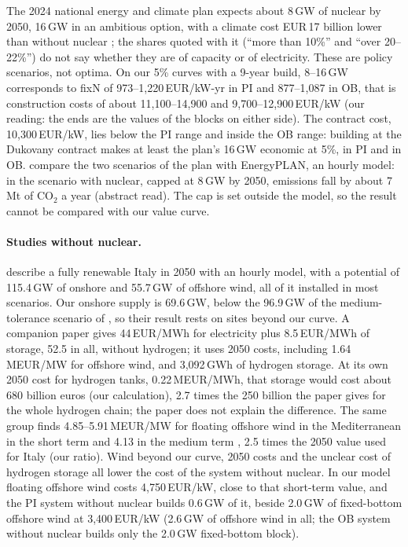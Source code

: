 The 2024 national energy and climate plan expects about 8\,GW of nuclear by 2050, 16\,GW in an ambitious option, with a climate cost EUR\,17 billion lower than without nuclear \citep{WNNPNIEC2024}; the shares quoted with it (``more than 10\%'' and ``over 20--22\%'') do not say whether they are of capacity or of electricity. These are policy scenarios, not optima. On our 5\% curves with a 9-year build, 8--16\,GW corresponds to fixN of 973--1{,}220\,EUR/kW-yr in PI and 877--1{,}087 in OB, that is construction costs of about 11{,}100--14{,}900 and 9{,}700--12{,}900\,EUR/kW (our reading: the ends are the values of the blocks on either side). The contract cost, 10{,}300\,EUR/kW, lies below the PI range and inside the OB range: building at the Dukovany contract makes at least the plan's 16\,GW economic at 5\%, in PI and in OB. \citet{Battaglia2025} compare the two scenarios of the plan with EnergyPLAN, an hourly model: in the scenario with nuclear, capped at 8\,GW by 2050, emissions fall by about 7\,Mt of CO$_2$ a year (abstract read). The cap is set outside the model, so the result cannot be compared with our value curve.

\paragraph{Studies without nuclear.} \citet{Pastore2025a} describe a fully renewable Italy in 2050 with an hourly model, with a potential of 115.4\,GW of onshore and 55.7\,GW of offshore wind, all of it installed in most scenarios. Our onshore supply is 69.6\,GW, below the 96.9\,GW of the medium-tolerance scenario of \citet{Price2026}, so their result rests on sites beyond our curve. A companion paper \citep{Pastore2025b} gives 44\,EUR/MWh for electricity plus 8.5\,EUR/MWh of storage, 52.5 in all, without hydrogen; it uses 2050 costs, including 1.64\,MEUR/MW for offshore wind, and 3{,}092\,GWh of hydrogen storage. At its own 2050 cost for hydrogen tanks, 0.22\,MEUR/MWh, that storage would cost about 680 billion euros (our calculation), 2.7 times the 250 billion the paper gives for the whole hydrogen chain; the paper does not explain the difference. The same group finds 4.85--5.91\,MEUR/MW for floating offshore wind in the Mediterranean in the short term and 4.13 in the medium term \citep{Vespasiano2026}, 2.5 times the 2050 value used for Italy (our ratio). Wind beyond our curve, 2050 costs and the unclear cost of hydrogen storage all lower the cost of the system without nuclear. In our model floating offshore wind costs 4{,}750\,EUR/kW, close to that short-term value, and the PI system without nuclear builds 0.6\,GW of it, beside 2.0\,GW of fixed-bottom offshore wind at 3{,}400\,EUR/kW (2.6\,GW of offshore wind in all; the OB system without nuclear builds only the 2.0\,GW fixed-bottom block).

